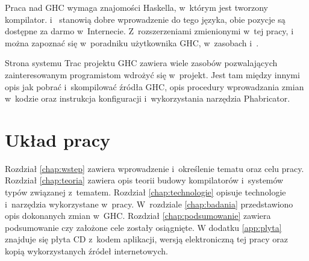 Praca nad GHC wymaga znajomości Haskella, w~którym jest tworzony
kompilator. \cite{LearnYouAHaskell} i~\cite{RealWorldHaskell} stanowią dobre
wprowadzenie do tego języka, obie pozycje są dostępne za darmo w~Internecie.
Z~rozszerzeniami zmienionymi w~tej pracy, 
i~ można zapoznać się w~poradniku użytkownika GHC,
w~zasobach \cite{GuideTypeFamilies} i~\cite{GuidePartialTypeSignatures}.

Strona systemu Trac projektu GHC zawiera wiele zasobów pozwalających
zainteresowanym programistom wdrożyć się w~projekt. Jest tam między innymi opis
jak pobrać i~skompilować źródła GHC\cite{WikiNewcomers}, opis procedury
wprowadzania zmian w~kodzie\cite{WikiFixingBugs} oraz instrukcja konfiguracji
i~wykorzystania narzędzia Phabricator\cite{WikiPhabricator}.

\section{Układ pracy}\label{sec:uklad_pracy}

Rozdział \ref{chap:wstep} zawiera wprowadzenie i~określenie tematu oraz celu
pracy. Rozdział \ref{chap:teoria} zawiera opis teorii budowy kompilatorów
i~systemów typów związanej z~tematem. Rozdział \ref{chap:technologie}
opisuje technologie i~narzędzia wykorzystane w~pracy. W~rozdziale
\ref{chap:badania} przedstawiono opis dokonanych zmian w~GHC. Rozdział
\ref{chap:podsumowanie} zawiera podsumowanie czy założone cele zostały
osiągnięte. W dodatku \ref{app:plyta} znajduje się płyta CD z~kodem aplikacji,
wersją elektroniczną tej pracy oraz kopią wykorzystanych źródeł internetowych.
